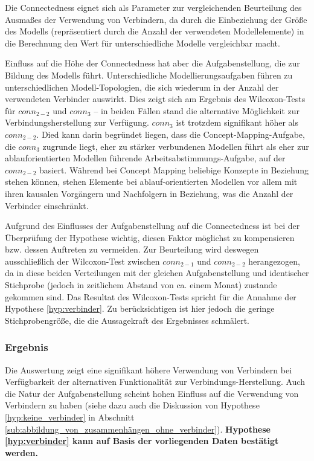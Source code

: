 Die Connectedness eignet sich als Parameter zur vergleichenden Beurteilung des Ausmaßes der Verwendung von Verbindern, da durch die Einbeziehung der Größe des Modells (repräsentiert durch die Anzahl der verwendeten Modellelemente) in die Berechnung den Wert für unterschiedliche Modelle vergleichbar macht. 

Einfluss auf die Höhe der Connectedness hat aber die Aufgabenstellung, die zur Bildung des Modells führt. Unterschiedliche Modellierungsaufgaben führen zu unterschiedlichen Modell-Topologien, die sich wiederum in der Anzahl der verwendeten Verbinder auswirkt. Dies zeigt sich am Ergebnis des Wilcoxon-Tests für $conn_{2-2}$ und $conn_{3}$ -- in beiden Fällen stand die alternative Möglichkeit zur Verbindungsherstellung zur Verfügung. $conn_{3}$ ist trotzdem signifikant höher als $conn_{2-2}$. Died kann darin begründet liegen, dass die Concept-Mapping-Aufgabe, die $conn_{3}$ zugrunde liegt, eher zu stärker verbundenen Modellen führt als eher zur ablauforientierten Modellen führende Arbeitsabstimmungs-Aufgabe, auf der $conn_{2-2}$ basiert. Während bei Concept Mapping beliebige Konzepte in Beziehung stehen können, stehen Elemente bei ablauf-orientierten Modellen vor allem mit ihren kausalen Vorgängern und Nachfolgern in Beziehung, was die Anzahl der Verbinder einschränkt.

Aufgrund des Einflusses der Aufgabenstellung auf die Connectedness ist bei der Überprüfung der Hypothese wichtig, diesen Faktor möglichst zu kompensieren bzw. dessen Auftreten zu vermeiden. Zur Beurteilung wird deswegen ausschließlich der Wilcoxon-Test zwischen $conn_{2-1}$ und $conn_{2-2}$ herangezogen, da in diese beiden Verteilungen mit der gleichen Aufgabenstellung und identischer Stichprobe (jedoch in zeitlichem Abstand von ca. einem Monat) zustande gekommen sind. Das Resultat des Wilcoxon-Tests spricht für die Annahme der Hypothese \ref{hyp:verbinder}. Zu berücksichtigen ist hier jedoch die geringe Stichprobengröße, die die Aussagekraft des Ergebnisses schmälert.

\subsubsection{Ergebnis} %

Die Auswertung zeigt eine signifikant höhere Verwendung von Verbindern bei Verfügbarkeit der alternativen Funktionalität zur Verbindungs-Herstellung. Auch die Natur der Aufgabenstellung scheint hohen Einfluss auf die Verwendung von Verbindern zu haben (siehe dazu auch die Diskussion von Hypothese \ref{hyp:keine_verbinder} in Abschnitt \ref{sub:abbildung_von_zusammenhängen_ohne_verbinder}). \textbf{Hypothese \ref{hyp:verbinder} kann auf Basis der vorliegenden Daten bestätigt werden.}

